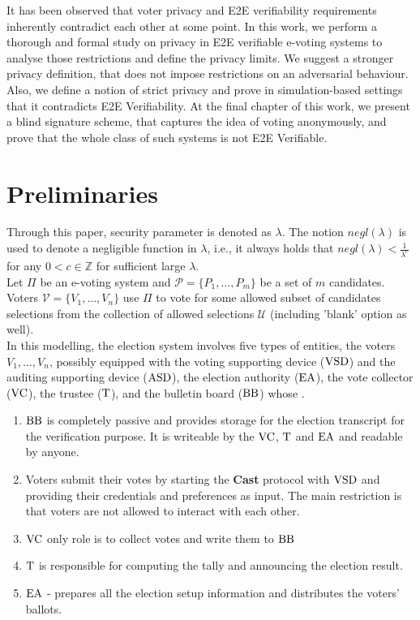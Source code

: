 It has been observed that voter privacy and E2E verifiability requirements inherently contradict each other at some point. In this work, we perform a thorough and formal study on privacy in E2E verifiable e-voting systems to analyse those restrictions and define the privacy limits. We suggest a stronger privacy definition, that does not impose restrictions on an adversarial behaviour. Also, we define a notion of strict privacy and prove in simulation-based settings that it contradicts E2E Verifiability. At the final chapter of this work, we present a blind signature scheme, that captures the idea of voting anonymously, and prove that the whole class of such systems is not E2E Verifiable.  

\section{Preliminaries}
Through this paper, security parameter is denoted as $\lambda$. The notion $negl(\lambda)$ is used to denote a negligible function in $\lambda$, i.e., it always holds that $negl(\lambda) < \frac{1}{\lambda^c}$ for any $0<c \in \mathbb{Z}$ for sufficient large $\lambda$. \\

Let $\Pi$ be an e-voting system and $\mathcal{P} = \{P_1,\dots,P_m\}$ be a set of $m$ candidates. Voters $\mathcal{V} = \{V_1,\dots,V_n\}$ use $\Pi$ to vote for some allowed subset of candidates selections from the collection of allowed selections $\mathcal{U}$ (including 'blank' option as well). \\
 
 In this modelling, the election system involves five types of entities, the voters $V_1, \dots , V_n$, possibly equipped with the voting supporting device ($\operatorname{VSD}$) and the auditing supporting device ($\operatorname{ASD}$), the election authority ($\operatorname{EA}$), the vote collector ($\operatorname{VC}$), the trustee ($\operatorname{T}$), and the bulletin board ($\operatorname{BB}$) whose . 
\begin{enumerate}
\item $\operatorname{BB}$ is completely passive and provides storage for the election transcript for the verification purpose. It is writeable by the $\operatorname{VC}$, $\operatorname{T}$ and $\operatorname{EA}$ and readable by anyone. 
\item Voters submit their votes by starting the \textbf{Cast} protocol with $\operatorname{VSD}$ and providing their credentials and preferences as input. The main restriction is that voters are not allowed to interact with each other. 
\item $\operatorname{VC}$ only role is to collect votes and write them to $\operatorname{BB}$
\item $\operatorname{T}$ is responsible for computing the tally and announcing the election result.
\item $\operatorname{EA}$ - prepares all the election setup information and distributes the voters' ballots.
\end{enumerate}

